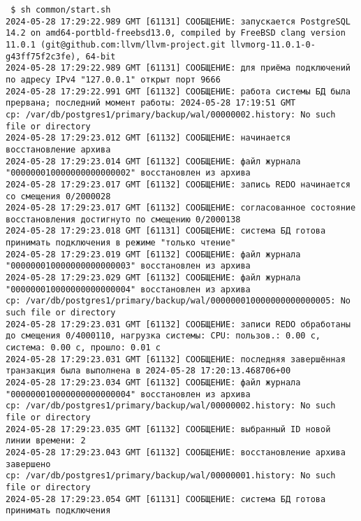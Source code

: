 \documentclass{article}
\begin{document}
\texttt{
    \$ sh common/start.sh \\
    2024-05-28 17:29:22.989 GMT [61131] СООБЩЕНИЕ:  запускается PostgreSQL 14.2 on amd64-portbld-freebsd13.0, compiled by FreeBSD clang version 11.0.1 (git@github.com:llvm/llvm-project.git llvmorg-11.0.1-0-g43ff75f2c3fe), 64-bit\\
    2024-05-28 17:29:22.989 GMT [61131] СООБЩЕНИЕ:  для приёма подключений по адресу IPv4 "127.0.0.1" открыт порт 9666\\
    2024-05-28 17:29:22.991 GMT [61132] СООБЩЕНИЕ:  работа системы БД была прервана; последний момент работы: 2024-05-28 17:19:51 GMT\\
    cp: /var/db/postgres1/primary/backup/wal/00000002.history: No such file or directory\\
    2024-05-28 17:29:23.012 GMT [61132] СООБЩЕНИЕ:  начинается восстановление архива\\
    2024-05-28 17:29:23.014 GMT [61132] СООБЩЕНИЕ:  файл журнала "000000010000000000000002" восстановлен из архива\\
    2024-05-28 17:29:23.017 GMT [61132] СООБЩЕНИЕ:  запись REDO начинается со смещения 0/2000028\\
    2024-05-28 17:29:23.017 GMT [61132] СООБЩЕНИЕ:  согласованное состояние восстановления достигнуто по смещению 0/2000138\\
    2024-05-28 17:29:23.018 GMT [61131] СООБЩЕНИЕ:  система БД готова принимать подключения в режиме "только чтение"\\
    2024-05-28 17:29:23.019 GMT [61132] СООБЩЕНИЕ:  файл журнала "000000010000000000000003" восстановлен из архива\\
    2024-05-28 17:29:23.029 GMT [61132] СООБЩЕНИЕ:  файл журнала "000000010000000000000004" восстановлен из архива\\
    cp: /var/db/postgres1/primary/backup/wal/000000010000000000000005: No such file or directory\\
    2024-05-28 17:29:23.031 GMT [61132] СООБЩЕНИЕ:  записи REDO обработаны до смещения 0/4000110, нагрузка системы: CPU: пользов.: 0.00 с, система: 0.00 с, прошло: 0.01 с\\
    2024-05-28 17:29:23.031 GMT [61132] СООБЩЕНИЕ:  последняя завершённая транзакция была выполнена в 2024-05-28 17:20:13.468706+00\\
    2024-05-28 17:29:23.034 GMT [61132] СООБЩЕНИЕ:  файл журнала "000000010000000000000004" восстановлен из архива\\
    cp: /var/db/postgres1/primary/backup/wal/00000002.history: No such file or directory\\
    2024-05-28 17:29:23.035 GMT [61132] СООБЩЕНИЕ:  выбранный ID новой линии времени: 2\\
    2024-05-28 17:29:23.043 GMT [61132] СООБЩЕНИЕ:  восстановление архива завершено\\
    cp: /var/db/postgres1/primary/backup/wal/00000001.history: No such file or directory\\
    2024-05-28 17:29:23.054 GMT [61131] СООБЩЕНИЕ:  система БД готова принимать подключения\\
}
\end{document}
